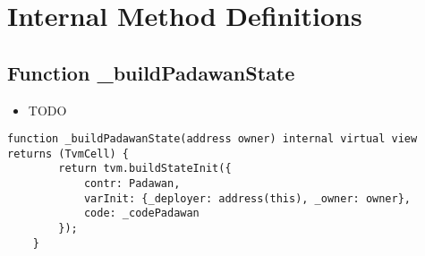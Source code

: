 \section{Internal Method Definitions}


\subsection{Function \_{}buildPadawanState}

\begin{itemize}
\item TODO
\end{itemize}

\begin{lstlisting}[firstnumber=16]
    function _buildPadawanState(address owner) internal virtual view returns (TvmCell) {
        return tvm.buildStateInit({
            contr: Padawan,
            varInit: {_deployer: address(this), _owner: owner},
            code: _codePadawan
        });
    }
\end{lstlisting}
